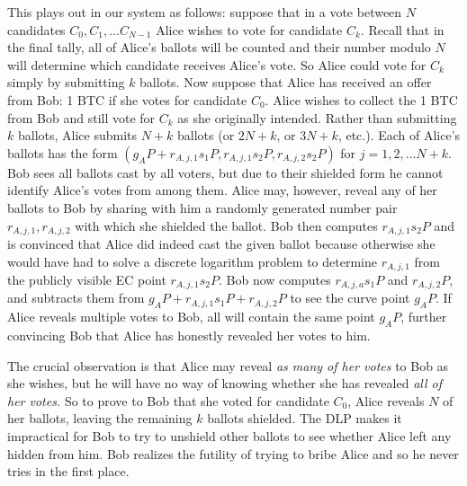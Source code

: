 \documentclass{article}
\begin{document}
This plays out in our system as follows: suppose that in a vote between $N$ candidates $C_0, C_1, \ldots C_{N-1}$ Alice wishes to vote for candidate $C_k$.  Recall that in the final tally, all of Alice's ballots will be counted and their number modulo $N$ will determine which candidate receives Alice's vote. So Alice could vote for $C_k$ simply by submitting $k$ ballots.  Now suppose that Alice has received an offer from Bob: 1 BTC if she votes for candidate $C_0$. Alice wishes to collect the 1 BTC from Bob and still vote for $C_k$ as she originally intended. Rather than submitting $k$ ballots, Alice submits $N+k$ ballots (or $2N+k$, or $3N+k$, etc.).  Each of Alice's ballots has the form $(g_A  P + r_{A,j,1} s_1 P, r_{A,j,1} s_2 P, r_{A,j,2}s_2P)$ for $j=1,2, \ldots N+k$. Bob sees all ballots cast by all voters, but due to their shielded form he cannot identify Alice's votes from among them.  Alice may, however, reveal any of her ballots to Bob by sharing with him a randomly generated number pair $r_{A,j,1}, r_{A,j,2}$ with which she shielded the ballot.  Bob then computes $r_{A,j,1} s_2 P$ and is convinced that Alice did indeed cast the given ballot because otherwise she would have had to solve a discrete logarithm problem to determine $r_{A,j,1}$ from the publicly visible EC point $r_{A,j,1}s_2 P$.  Bob now computes $r_{A,j,a} s_1 P$ and $r_{A,j,2}P$, and subtracts them from $g_A P + r_{A,j,1} s_1 P + r_{A,j,2}P$ to see the curve point $g_A P$.  If Alice reveals multiple votes to Bob, all will contain the same point $g_A P$, further convincing Bob that Alice has honestly revealed her votes to him.  

The crucial observation is that Alice may reveal \emph{as many of her votes} to Bob as she wishes, but he will have no way of knowing whether she has revealed \emph{all of her votes.}  So to prove to Bob that she voted for candidate $C_0$, Alice reveals $N$ of her ballots, leaving the remaining $k$ ballots shielded.  The DLP makes it impractical for Bob to try to unshield other ballots to see whether Alice left any hidden from him.  Bob realizes the futility of trying to bribe Alice and so he never tries in the first place.
\end{document}
